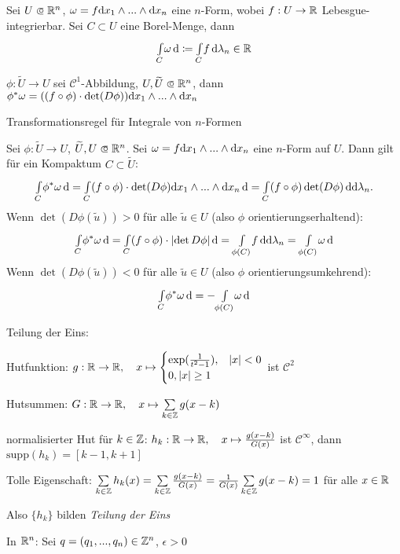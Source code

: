 \documentclass{cheat-sheet}
\begin{document}
\begin{defn}
  Sei $U \opn \R^n$, $\omega = f \mathrm{d} x_1 \wedge ... \wedge \mathrm{d} x_n$ eine $n$-Form, wobei $f : U \to \mathbb{R}$ Lebesgue-integrierbar. Sei $C \subset U$ eine Borel-Menge, dann
  \[ {\textstyle \int\limits_{C}^{}} \omega \,\mathrm{d} \coloneqq {\textstyle \int\limits_{C}^{}} f \,\mathrm{d} \lambda_n \in \mathbb{R} \]
\end{defn}


$\phi : \widetilde{U} \to U$ sei $\mathcal{C}^1$-Abbildung, $U, \widetilde{U} \opn \R^n$, dann
$\phi^* \omega = ((f \circ \phi) \cdot \det(D\phi)) \mathrm{d} x_1 \wedge ... \wedge \mathrm{d} x_n$

Transformationsregel für Integrale von $n$-Formen

Sei $\phi : \widetilde{U} \to U$, $\widetilde{U}, U \opn \R^n$. Sei $\omega = f \mathrm{d} x_1 \wedge ... \wedge \mathrm{d} x_n$ eine $n$-Form auf $U$. Dann gilt für ein Kompaktum $C \subset \widetilde{U}$:
\[ {\textstyle \int\limits_{C}^{}} \phi^* \omega \,\mathrm{d} = {\textstyle \int\limits_{C}^{}} (f \circ \phi) \cdot \det(D\phi) \mathrm{d} x_1 \wedge ... \wedge \mathrm{d} x_n \,\mathrm{d} = {\textstyle \int\limits_{C}^{}} (f \circ \phi) \det(D\phi) \,\mathrm{d} \mathrm{d} \lambda_n. \]
Wenn $\det(D\phi(\widetilde{u})) > 0$ für alle $\widetilde{u} \in U$ (also $\phi$ orientierungserhaltend):
\[ {\textstyle \int\limits_{C}^{}} \phi^* \omega \,\mathrm{d} = {\textstyle \int\limits_{C}^{}} (f \circ \phi) \cdot \lvert\det{D\phi}\rvert \,\mathrm{d} = {\textstyle \int\limits_{\phi(C)}^{}} f \,\mathrm{d} \mathrm{d} \lambda_n = {\textstyle \int\limits_{\phi(C)}^{}} \omega \,\mathrm{d} \]
Wenn $\det(D\phi(\widetilde{u})) < 0$ für alle $\widetilde{u} \in U$ (also $\phi$ orientierungsumkehrend):
\[ {\textstyle \int\limits_{C}^{}} \phi^* \omega \,\mathrm{d} = - {\textstyle \int\limits_{\phi(C)}^{}} \omega \,\mathrm{d} \]

Teilung der Eins:

Hutfunktion: $g : \mathbb{R} \to \mathbb{R}, \quad x \mapsto \begin{cases} \exp(\frac{1}{t^2 - 1}), & \lvert x\rvert < 0 \\ 0, \lvert x\rvert \geq 1 \end{cases}$ ist $\mathcal{C}^2$

Hutsummen: $G : \R \to \R, \quad x \mapsto \sum_{k \in \Z} g(x-k)$

normalisierter Hut für $k \in \mathbb{Z}$: $h_k : \mathbb{R} \to \mathbb{R}, \quad x \mapsto \frac{g(x-k)}{G(x)}$ ist $\mathcal{C}^\infty$, dann $\mathrm{supp}(h_k) = \left[ k-1, k+1 \right]$

Tolle Eigenschaft: $\sum_{k \in \Z} h_k(x) = \sum_{k \in \Z} \frac{g(x-k)}{G(x)} = \frac{1}{G(x)} \sum_{k \in \Z} g(x-k) = 1$ für alle $x \in \mathbb{R}$

Also $\{ h_k \}$ bilden \emph{Teilung der Eins}

In $\mathbb{R}^n$: Sei $q = (q_1, ..., q_n) \in \mathbb{Z}^n$, $\epsilon > 0$
\end{document}
